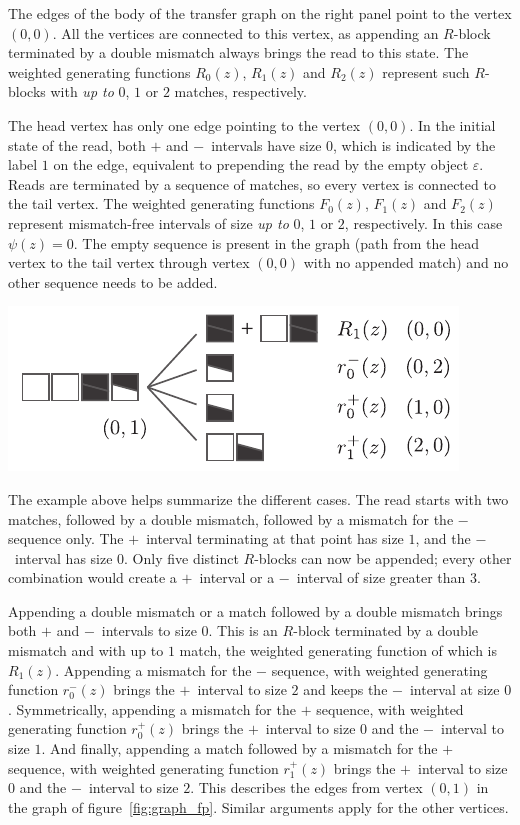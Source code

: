 \documentclass{article}
\newenvironment{inset}
{\vspace{0.5\baselineskip}\begin{center}}
{\end{center}\vspace{0.5\baselineskip}}
\begin{document}
The edges of the body of the transfer graph on the right panel point to
the vertex $(0,0)$. All the vertices are connected to this vertex, as
appending an $R$-block terminated by a double mismatch always brings the
read to this state. The weighted generating functions $R_0(z)$, $R_1(z)$
and $R_2(z)$ represent such $R$-blocks with \emph{up to} $0$, $1$ or $2$
matches, respectively.

The head vertex has only one edge pointing to the vertex $(0,0)$. In the
initial state of the read, both $+$ and $-$~intervals have size $0$, which
is indicated by the label $1$ on the edge, equivalent to prepending the
read by the empty object $\varepsilon$. Reads are terminated by a sequence
of matches, so every vertex is connected to the tail vertex. The weighted
generating functions $F_0(z)$, $F_1(z)$ and $F_2(z)$ represent
mismatch-free intervals of size \emph{up to} $0$, $1$ or $2$,
respectively. In this case $\psi(z) = 0$. The empty sequence is 
present in the graph (path from the head vertex to the tail vertex through
vertex $(0,0)$ with no appended match) and no other sequence needs to be
added.

\begin{inset}
\includegraphics[scale=0.9]{example_dual.pdf}
\end{inset}

The example above helps summarize the different cases. The read starts
with two matches, followed by a double mismatch, followed by a mismatch
for the $-$ sequence only. The $+$~interval terminating at that point has
size $1$, and the $-$~interval has size $0$. Only five distinct $R$-blocks
can now be appended; every other combination would create a $+$~interval
or a $-$~interval of size greater than $3$.

Appending a double mismatch or a match followed by a double mismatch
brings both $+$ and $-$~intervals to size $0$. This is an $R$-block
terminated by a double mismatch and with up to $1$ match, the weighted
generating function of which is $R_1(z)$. Appending a mismatch for the $-$
sequence, with weighted generating function $r_0^-(z)$ brings the
$+$~interval to size $2$ and keeps the $-$~interval at size $0$.
Symmetrically, appending a mismatch for the $+$ sequence, with weighted
generating function $r_0^+(z)$ brings the $+$~interval to size $0$ and the
$-$~interval to size $1$. And finally, appending a match followed by a
mismatch for the $+$ sequence, with weighted generating function
$r_1^+(z)$ brings the $+$~interval to size $0$ and the $-$~interval to
size $2$. This describes the edges from vertex $(0,1)$ in the graph of
figure~\ref{fig:graph_fp}. Similar arguments apply for the other vertices.
\end{document}
